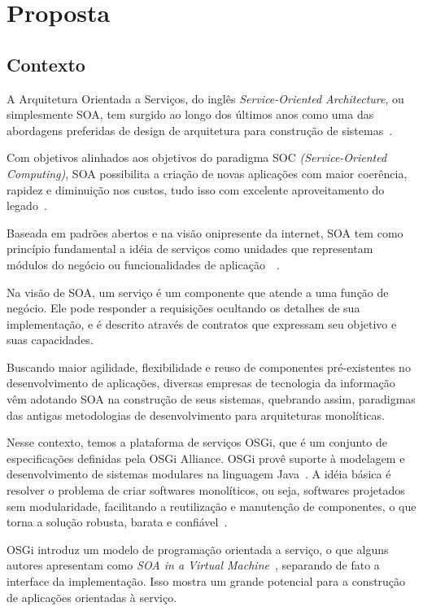\chapter{Proposta}
\section{Contexto}
\label{pr:contex}

A Arquitetura Orientada a Serviços, do inglês \textit{Service-Oriented Architecture}, ou simplesmente SOA, tem surgido ao longo dos últimos anos como uma das abordagens preferidas de design de arquitetura para construção de sistemas~\cite{erl2008soa}.

Com objetivos alinhados aos objetivos do paradigma SOC \textit{(Service-Oriented Computing)}, SOA possibilita a criação de novas aplicações com maior coerência, rapidez e diminuição nos custos, tudo isso com excelente aproveitamento do legado~\cite{erl2008soa}.

Baseada em padrões abertos e na visão onipresente da internet, SOA tem como princípio fundamental a idéia de serviços como unidades que representam módulos do negócio ou funcionalidades de aplicação~\cite{erl2008soa}~\cite{imb2007soa}.

Na visão de SOA, um serviço é um componente que atende a uma função de negócio. Ele pode responder a requisições ocultando os detalhes de sua implementação, e é descrito através de contratos que expressam seu objetivo e suas capacidades.

Buscando maior agilidade, flexibilidade e reuso de componentes pré-existentes no desenvolvimento de aplicações, diversas empresas de tecnologia da informação vêm adotando SOA na construção de seus sistemas, quebrando assim, paradigmas das antigas metodologias de desenvolvimento para arquiteturas monolíticas.

Nesse contexto, temos a plataforma de serviços OSGi, que é um conjunto de especificações definidas pela OSGi Alliance. OSGi provê suporte à modelagem e desenvolvimento de sistemas modulares na linguagem Java~\cite{hall2010osgi}. A idéia básica é resolver o problema de criar softwares monolíticos, ou seja, softwares projetados sem modularidade, facilitando a reutilização e manutenção de  componentes, o que torna a solução robusta, barata e confiável~\cite{davis2009open}.

OSGi introduz um modelo de programação orientada a serviço, o que alguns autores apresentam como \textit{SOA in a Virtual Machine}~\cite{hall2010osgi}, separando de fato a interface da implementação. Isso mostra um grande potencial para a construção de aplicações orientadas à serviço.


